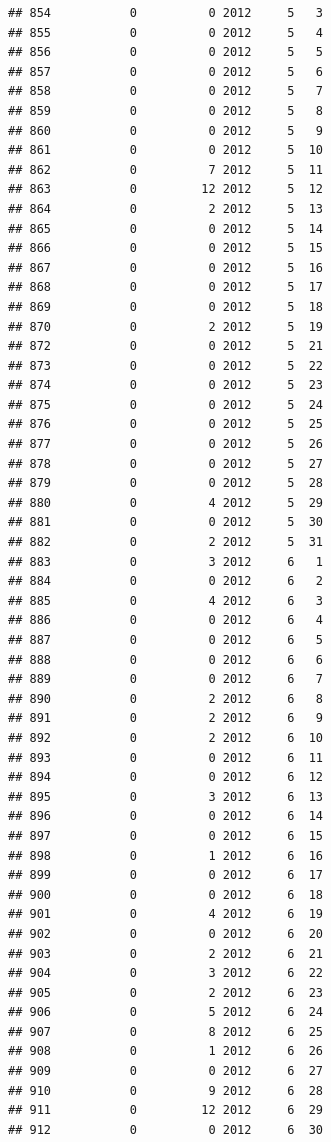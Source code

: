 \documentclass[
]{article}
\begin{document}
\begin{verbatim}
## 854           0          0 2012     5   3
## 855           0          0 2012     5   4
## 856           0          0 2012     5   5
## 857           0          0 2012     5   6
## 858           0          0 2012     5   7
## 859           0          0 2012     5   8
## 860           0          0 2012     5   9
## 861           0          0 2012     5  10
## 862           0          7 2012     5  11
## 863           0         12 2012     5  12
## 864           0          2 2012     5  13
## 865           0          0 2012     5  14
## 866           0          0 2012     5  15
## 867           0          0 2012     5  16
## 868           0          0 2012     5  17
## 869           0          0 2012     5  18
## 870           0          2 2012     5  19
## 872           0          0 2012     5  21
## 873           0          0 2012     5  22
## 874           0          0 2012     5  23
## 875           0          0 2012     5  24
## 876           0          0 2012     5  25
## 877           0          0 2012     5  26
## 878           0          0 2012     5  27
## 879           0          0 2012     5  28
## 880           0          4 2012     5  29
## 881           0          0 2012     5  30
## 882           0          2 2012     5  31
## 883           0          3 2012     6   1
## 884           0          0 2012     6   2
## 885           0          4 2012     6   3
## 886           0          0 2012     6   4
## 887           0          0 2012     6   5
## 888           0          0 2012     6   6
## 889           0          0 2012     6   7
## 890           0          2 2012     6   8
## 891           0          2 2012     6   9
## 892           0          2 2012     6  10
## 893           0          0 2012     6  11
## 894           0          0 2012     6  12
## 895           0          3 2012     6  13
## 896           0          0 2012     6  14
## 897           0          0 2012     6  15
## 898           0          1 2012     6  16
## 899           0          0 2012     6  17
## 900           0          0 2012     6  18
## 901           0          4 2012     6  19
## 902           0          0 2012     6  20
## 903           0          2 2012     6  21
## 904           0          3 2012     6  22
## 905           0          2 2012     6  23
## 906           0          5 2012     6  24
## 907           0          8 2012     6  25
## 908           0          1 2012     6  26
## 909           0          0 2012     6  27
## 910           0          9 2012     6  28
## 911           0         12 2012     6  29
## 912           0          0 2012     6  30

\end{verbatim}
\end{document}
